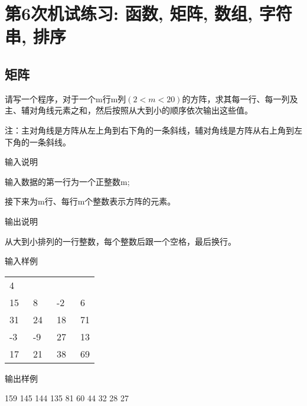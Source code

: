 %
%
%
\chapter{第6次机试练习: 函数, 矩阵, 数组, 字符串, 排序}


\section{矩阵}
请写一个程序，对于一个m行m列$(2<m<20)$的方阵，求其每一行、每一列及主、辅对角线元素之和，然后按照从大到小的顺序依次输出这些值。

注：主对角线是方阵从左上角到右下角的一条斜线，辅对角线是方阵从右上角到左下角的一条斜线。

输入说明

输入数据的第一行为一个正整数m;

接下来为m行、每行m个整数表示方阵的元素。

输出说明	

从大到小排列的一行整数，每个整数后跟一个空格，最后换行。

输入样例

\begin{tabular}{llll}
4&&&\\
15  &~8   &~-2   &~6\\
31  &~24  &~18  &~71\\
-3  &~-9  &~27  &~13\\
17  &~21  &~38  &~69
\end{tabular}

输出样例

159 145 144 135 81 60 44 32 28 27

